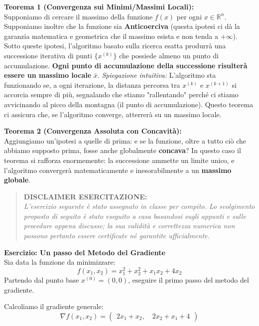 \documentclass[12pt, a4paper]{article}
\newcommand{\separatore}{\noindent{\color{titlecolor!50}\rule{\textwidth}{0.6pt}}}
\begin{document}
	\textbf{Teorema 1 (Convergenza sui Minimi/Massimi Locali):}\\
	Supponiamo di cercare il massimo della funzione $f(x)$ per ogni $x \in \mathbb{R}^n$. 
	Supponiamo inoltre che la funzione sia \textbf{Anticoerciva} (questa ipotesi ci dà la garanzia matematica e geometrica che il massimo esista e non tenda a $+\infty$). 
	Sotto queste ipotesi, l'algoritmo basato sulla ricerca esatta produrrà una successione iterativa di punti $\{x^{(k)}\}$ che possiede almeno un punto di accumulazione. \textbf{Ogni punto di accumulazione della successione risulterà essere un massimo locale} $\bar{x}$.
	\textit{Spiegazione intuitiva:} L'algoritmo sta funzionando se, a ogni iterazione, la distanza percorsa tra $x^{(k)}$ e $x^{(k+1)}$ si accorcia sempre di più, segnalando che stiamo "rallentando" perché ci stiamo avvicinando al picco della montagna (il punto di accumulazione). Questo teorema ci assicura che, se l'algoritmo converge, atterrerà su un massimo locale.
	
	\textbf{Teorema 2 (Convergenza Assoluta con Concavità):}\\
	Aggiungiamo un'ipotesi a quelle di prima: e se la funzione, oltre a tutto ciò che abbiamo supposto prima, fosse anche globalmente \textbf{concava}?
	In questo caso il teorema si rafforza enormemente: la successione ammette un limite unico, e l'algoritmo convergerà matematicamente e inesorabilmente a un \textbf{massimo globale}.
	
	\vspace{0.6cm}
	\separatore
	\vspace{0.4cm}
	
	\begin{quote}
		\textbf{DISCLAIMER ESERCITAZIONE:}\\
		\textit{L'esercizio seguente è stato assegnato in classe per compito. Lo svolgimento proposto di seguito è stato eseguito a casa basandosi sugli appunti e sulle procedure appena discusse; la sua validità e correttezza numerica non possono pertanto essere certificate né garantite ufficialmente.}
	\end{quote}
	
	\textbf{Esercizio: Un passo del Metodo del Gradiente}\\
	Sia data la funzione da minimizzare:
	\[ f(x_1, x_2) = x_1^2 + x_2^2 + x_1 x_2 + 4x_2 \]
	Partendo dal punto base $x^{(0)} = (0,0)$, eseguire il primo passo del metodo del gradiente.
	
	Calcoliamo il gradiente generale:
	\[ \nabla f(x_1, x_2) = \begin{pmatrix} 2x_1 + x_2\boldsymbol{,} \quad 2x_2 + x_1 + 4 \end{pmatrix} \]
	
\end{document}
